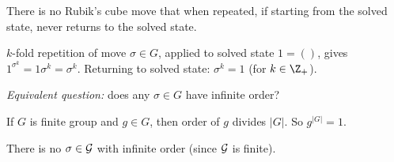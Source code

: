 \begin{slide}
    \begin{theorem}
        \vspace{0pt}
        There is no Rubik's cube move that when repeated, if starting from the solved state, never returns to the solved state.
    \end{theorem} \pause

    $k$-fold repetition of move $\sigma \in G$, applied to solved state $1 = ()$, gives $1^{\sigma^k} = 1\sigma^k = \sigma^k$. Returning to solved state: $\sigma^k = 1$ (for $k \in \Z_+$). \pause

    \textit{Equivalent question:} does any $\sigma \in G$ have infinite order? \pause

    \begin{proposition}
        \vspace{0pt}
        If $G$ is finite group and $g \in G$, then order of $g$ divides $|G|$. So $g^{|G|} = 1$.
    \end{proposition} \pause

    \begin{corollary}
        \vspace{0pt}
        There is no $\sigma \in \mathcal{G}$ with infinite order (since $\mathcal{G}$ is finite).
    \end{corollary}
\end{slide}